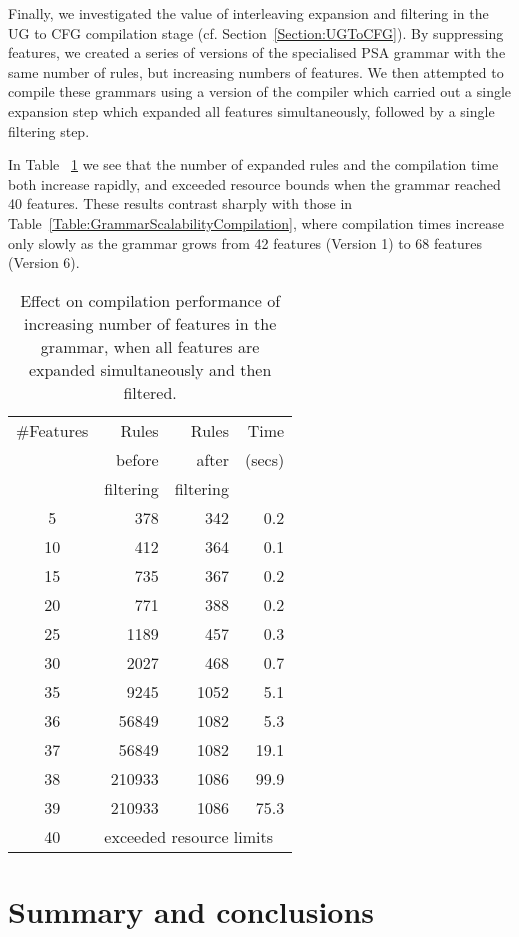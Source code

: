 \documentclass[11pt]{article}
\begin{document}
Finally, we investigated the value of interleaving expansion and
filtering in the UG to CFG compilation stage
(cf. Section~\ref{Section:UGToCFG}). By suppressing features, we
created a series of versions of the specialised PSA grammar with the
same number of rules, but increasing numbers of features. We then
attempted to compile these grammars using a version of the compiler
which carried out a single expansion step which expanded all features
simultaneously, followed by a single filtering step.

In Table ~\ref{Table:CorpusScalabilityFeatures} we see that the number
of expanded rules and the compilation time both increase rapidly, and
exceeded resource bounds when the grammar reached 40 features.  These
results contrast sharply with those in
Table~\ref{Table:GrammarScalabilityCompilation}, where compilation
times increase only slowly as the grammar grows from 42 features
(Version 1) to 68 features (Version 6).

\begin{table}
\begin{tabular}{|c||r|r|r|}
\hline
\#Features	&Rules		&Rules		&Time\\
		&before		&after		&(secs)\\
		&filtering	&filtering	&\\
\hline
\hline
5		&378		&342		&0.2\\
\hline
10		&412		&364		&0.1\\
\hline
15		&735		&367		&0.2\\
\hline
20		&771		&388		&0.2\\
\hline
25		&1189		&457		&0.3\\
\hline
30		&2027		&468		&0.7\\
\hline
35		&9245		&1052		&5.1\\
\hline
36		&56849		&1082		&5.3\\
\hline
37		&56849		&1082		&19.1\\
\hline
38		&210933		&1086		&99.9\\
\hline
39		&210933		&1086		&75.3\\
\hline
40		&\multicolumn{3}{l|}{exceeded resource limits}\\
\hline
\end{tabular}
\caption{Effect on compilation performance of increasing number of
features in the grammar, when all features are expanded
simultaneously and then filtered.}
\label{Table:CorpusScalabilityFeatures}
\end{table}

\section{Summary and conclusions}
\end{document}
